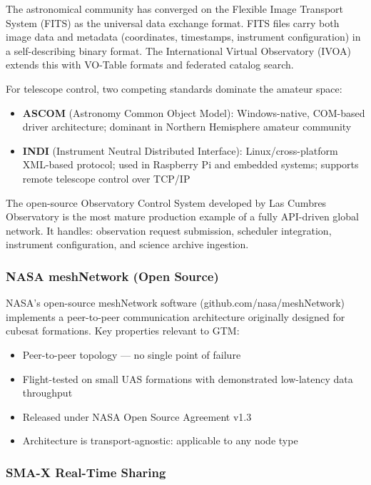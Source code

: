 \documentclass[11pt,letterpaper]{article}
\begin{document}
The astronomical community has converged on the Flexible Image Transport System (FITS) as the universal data exchange format. FITS files carry both image data and metadata (coordinates, timestamps, instrument configuration) in a self-describing binary format. The International Virtual Observatory (IVOA) extends this with VO-Table formats and federated catalog search.

For telescope control, two competing standards dominate the amateur space:
\begin{itemize}
  \item \textbf{ASCOM} (Astronomy Common Object Model): Windows-native, COM-based driver architecture; dominant in Northern Hemisphere amateur community
  \item \textbf{INDI} (Instrument Neutral Distributed Interface): Linux/cross-platform XML-based protocol; used in Raspberry Pi and embedded systems; supports remote telescope control over TCP/IP
\end{itemize}

The open-source Observatory Control System developed by Las Cumbres Observatory is the most mature production example of a fully API-driven global network. It handles: observation request submission, scheduler integration, instrument configuration, and science archive ingestion.

\subsubsection{NASA meshNetwork (Open Source)}

NASA's open-source meshNetwork software (github.com/nasa/meshNetwork) implements a peer-to-peer communication architecture originally designed for cubesat formations. Key properties relevant to GTM:
\begin{itemize}
  \item Peer-to-peer topology --- no single point of failure
  \item Flight-tested on small UAS formations with demonstrated low-latency data throughput
  \item Released under NASA Open Source Agreement v1.3
  \item Architecture is transport-agnostic: applicable to any node type
\end{itemize}

\subsubsection{SMA-X Real-Time Sharing}
\end{document}
